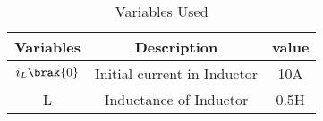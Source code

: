 \begin{table}[h]
\renewcommand\thetable{1}
    \centering
    \begin{tabular}{|c|c|c|}
    \hline
         Variables&Description&value  \\\hline
            $i_L\brak{0}$   &    Initial current in Inductor & 10A\\\hline
            L     & Inductance of Inductor & 0.5H\\\hline
    \end{tabular}
    \caption{Variables Used}
    \label{tab:EE_21_29_1}
\end{table}
